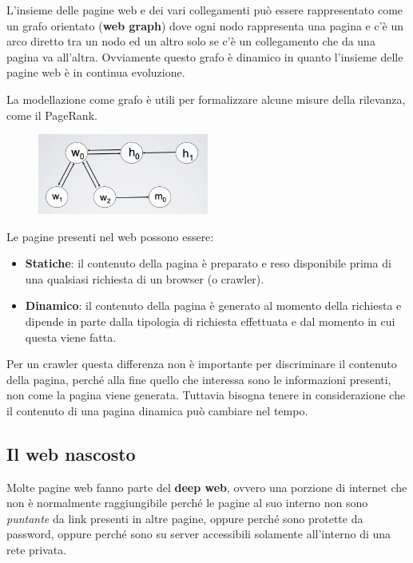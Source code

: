 L'insieme delle pagine web e dei vari collegamenti può essere rappresentato come un grafo orientato (\textbf{web graph}) dove ogni nodo rappresenta una pagina e c'è un arco diretto tra un nodo ed un altro solo se c'è un collegamento che da una pagina va all'altra.
Ovviamente questo grafo è dinamico in quanto l'insieme delle pagine web è in continua evoluzione.

La modellazione come grafo è utili per formalizzare alcune misure della rilevanza, come il PageRank.

\begin{figure}[htbp]
	\centering
	\includegraphics[width = 0.5\textwidth]{images/l17-fig-3}
\end{figure}

Le pagine presenti nel web possono essere:

\begin{itemize}
	\item \textbf{Statiche}: il contenuto della pagina è preparato e reso disponibile prima di una qualsiasi richiesta di un browser (o crawler).
	\item \textbf{Dinamico}: il contenuto della pagina è generato al momento della richiesta e dipende in parte dalla tipologia di richiesta effettuata e dal momento in cui questa viene fatta.
\end{itemize}

Per un crawler questa differenza non è importante per discriminare il contenuto della pagina, perché alla fine quello che interessa sono le informazioni presenti, non come la pagina viene generata.
Tuttavia bisogna tenere in considerazione che il contenuto di una pagina dinamica può cambiare nel tempo.

\subsection{Il web nascosto}

Molte pagine web fanno parte del \textbf{deep web}, ovvero una porzione di internet che non è normalmente raggiungibile perché le pagine al suo interno non sono \textit{puntante} da link presenti in altre pagine, oppure perché sono protette da password, oppure perché sono su server accessibili solamente all'interno di una rete privata.

